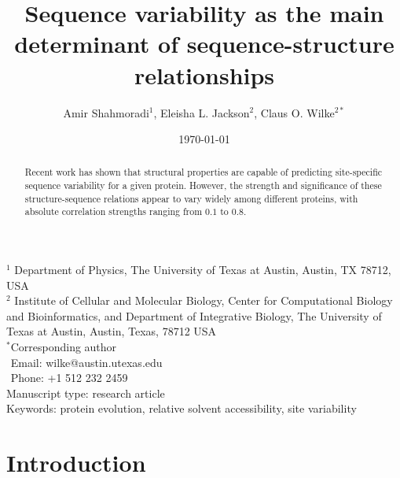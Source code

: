 \documentclass[12pt]{article}
\title{Sequence variability as the main determinant of sequence-structure relationships}
\author{Amir Shahmoradi$^1$, Eleisha L. Jackson$^2$, Claus O. Wilke$^{2*}$}
\begin{document}
\date{\today}
\maketitle


\noindent
$^1$ Department of Physics, The University of Texas at Austin, Austin, TX 78712, USA \\
$^2$ Institute of Cellular and Molecular Biology, Center for Computational Biology and Bioinformatics, and Department of Integrative Biology, The University of Texas at Austin, Austin, Texas, 78712 USA\\

\bigskip
\noindent
$^*$Corresponding author\\
$\phantom{^*}$Email: wilke@austin.utexas.edu\\
$\phantom{^*}$Phone: +1 512 232 2459\\

\bigskip
\noindent
Manuscript type: research article\\
\bigskip
\noindent  Keywords: protein evolution, relative solvent accessibility, site variability


\begin{abstract}
Recent work has shown that structural properties are capable of predicting site-specific sequence variability for a given protein. However, the strength and significance of these structure-sequence relations appear to vary widely among different proteins, with absolute correlation strengths ranging from $0.1$ to $0.8$. 
\end{abstract}
\vfill
\vfill
\def\thefootnote{\fnsymbol{footnote}}
\setcounter{footnote}{0}


\section{Introduction}
\label{sec:intro}
\end{document}
